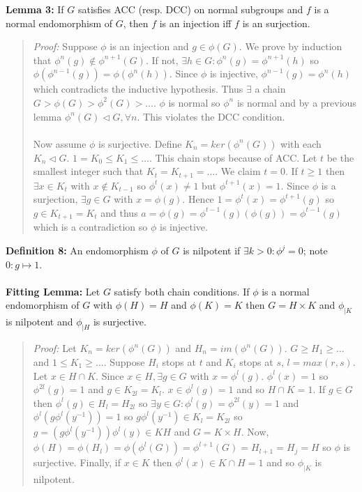 {\bf Lemma 3:} 
If $G$ satisfies ACC (resp. DCC) on normal subgroups 
and $f$ is a normal endomorphism
of $G$, then $f$ is an injection iff $f$ is an surjection.
\begin{quote}
\emph{Proof:}  
Suppose $\phi$ is an injection and $g \in \phi(G)$.   We prove by induction
that $\phi^n(g) \notin \phi^{n+1}(G)$.   If not, $\exists h \in  G: \phi^n(g)= \phi^{n+1}(h)$ 
so $\phi(\phi^{n-1}(g)) = \phi(\phi^{n}(h))$.  Since
$\phi$ is injective, $\phi^{n-1}(g)= \phi^n(h)$ which contradicts the inductive hypothesis.
Thus $\exists$ a chain $G > \phi(G) > \phi^2(G) > \ldots$.  $\phi$ is normal so
$\phi^n$ is normal and by a previous lemma $\phi^n(G) \lhd G, \forall n$.  This violates
the DCC condition.
\\
\\
Now assume $\phi$ is surjective.  Define $K_n= ker(\phi^n(G))$ with each $K_n \lhd G$.
$1 = K_0 \le K_1 \le \ldots $.  This chain stops because of ACC.  Let $t$ be the smallest integer
such that $K_t= K_{t+1} = \ldots$.  We claim $t=0$.  If $t \ge 1$ then $\exists x \in K_t$ with
$x \notin K_{t-1}$ so 
$\phi^{t}(x) \ne 1$ but $\phi^{t+1}(x)=1$.
Since $\phi$ is a surjection, $\exists g \in G$ with $x= \phi(g)$.  Hence
$1 = \phi^{t}(x) = \phi^{t+1}(g)$ so $g \in K_{t+1}= K_t$ and thus
$a= \phi(g)= \phi^{t-1}(g) ( \phi(g))= \phi^{t-1}(g)$ which is a contradiction so $\phi$
is injective.
\end{quote}
{\bf Definition 8:} An endomorphism $\phi$ of $G$ is nilpotent if $\exists k>0: \phi^j=0$;
note $0: g \mapsto 1$.
\\
\\
{\bf Fitting Lemma:}
Let $G$ satisfy both chain conditions.  If $\phi$ is a
normal endomorphism of $G$ with $\phi(H)=H$ and $\phi(K)=K$ then
$G= H \times K$ and
$\phi_{|K}$ is nilpotent and $\phi_{|H}$ is surjective.
\begin{quote}
\emph{Proof:}
Let $K_n= ker(\phi^n(G))$ and $H_n= im(\phi^n(G))$.
$G \ge H_1 \ge \ldots $ and 
$1 \le K_1 \ge \ldots $.  Suppose $H_i$ stops at $t$ and $K_i$ stops at $s$, $l= max(r,s)$.
Let $x \in H \cap K$.  Since $x \in H, \exists g \in G$ with $x= \phi^l(g)$.
$\phi^l(x)=1$ so $\phi^{2l}(g)=1$ and $g \in K_{2l}= K_l$.  $x \in \phi^l(g)=1$ and
so $H \cap K=1$.
If $g \in G$ then $\phi^l(g) \in H_l = H_{2l}$ so
$\exists y \in G: \phi^l(g)= \phi^{2l}(y)= 1$ and
$\phi^l(g \phi^l(y^{-1}))=1$ so
$g \phi^l(y^{-1}) \in K_{l}=K_{2l}$ so $g=(g \phi^l(y^{-1}))\phi^l(y) \in KH$ and $G= K \times H$.
Now, $\phi(H)=\phi(H_l)= \phi(\phi^l(G))= \phi^{l+1}(G)= H_{l+1}=H_j=H$ so
$\phi$ is surjective.  Finally, if $x \in K$ then $\phi^l(x) \in K \cap H=1$ and so
$\phi_{|K}$ is nilpotent.
\end{quote}
